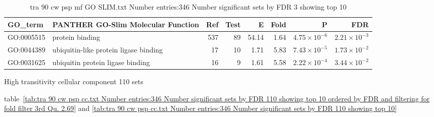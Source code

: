 \begin{table}[ht]
\centering
\begin{adjustbox}{width=\textwidth}
\begin{tabular}{llrrrrrr}
  \hline
GO\_term & PANTHER GO-Slim Molecular Function & Ref & Test & E & Fold & P & FDR \\ 
  \hline
GO:0005515 & protein binding  & 537 & 89 & 54.14 & 1.64 & $4.75 \times 10^{-6}$ & $2.21 \times 10^{-3}$ \\ 
  GO:0044389 & ubiquitin-like protein ligase binding  & 17 & 10 & 1.71 & 5.83 & $7.43 \times 10^{-5}$ & $1.73 \times 10^{-2}$ \\ 
  GO:0031625 & ubiquitin protein ligase binding  & 16 & 9 & 1.61 & 5.58 & $2.22 \times 10^{-4}$ & $3.44 \times 10^{-2}$ \\ 
  \hline
\end{tabular}
\end{adjustbox}
\caption{tra 90 cw psp mf GO SLIM.txt Number entries:346 Number significant sets by FDR 3 showing top 10} 
\label{tab:tra 90 cw psp mf GO SLIM.txt Number entries:346 Number significant sets by FDR 3 showing top 10}
\end{table}

High transitivity cellular component 110 sets

table~\ref{tab:tra 90 cw psp cc.txt Number entries:346 Number significant sets by FDR 110 showing top 10 ordered by FDR and filtering for fold filter 3rd Qu. 2.69}
and \ref{tab:tra 90 cw psp cc.txt Number entries:346 Number significant sets by FDR 110 showing top 10}

